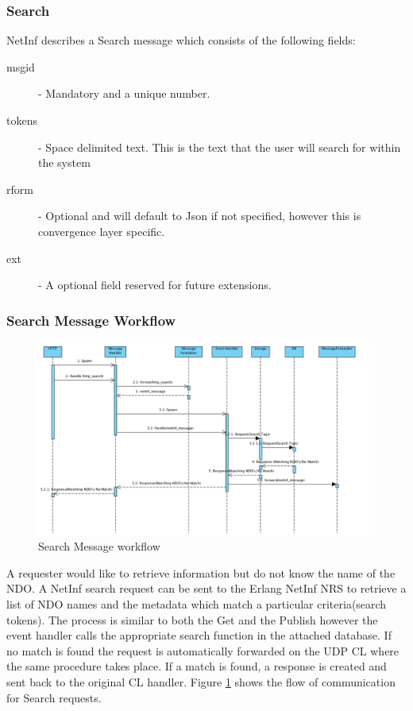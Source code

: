 \subsubsection{Search}

NetInf describes a Search message which consists of the following fields:

\begin{description}
\item[msgid] - Mandatory and a unique number.
\item[tokens] - Space delimited text. This is the text that the user will search for within the system
\item[rform] - Optional and will default to Json if not specified, however this is convergence layer specific.
\item[ext] - A optional field reserved for future extensions.
\end{description}

\subsubsection{Search Message Workflow}

\begin{figure}[H]
	\centering
\centerline{\includegraphics[width=1.2\textwidth]{./img/backend_seq_diagram_SEARCH.png}}
\caption{Search Message workflow}
\label{fig:searchfig}
\end{figure}

A requester would like to retrieve information but do not know the name of the NDO. A NetInf search request can be sent to the Erlang NetInf NRS to retrieve a list of NDO names and the metadata which match a particular criteria(search tokens). The process is similar to both the Get and the Publish however the event handler calls the appropriate search function in the attached database. If no match is found the request is automatically forwarded on the UDP CL where the same procedure takes place. If a match is found, a response is created  and sent back to the original CL handler. Figure \ref{fig:searchfig} shows the flow of communication for  Search requests.
